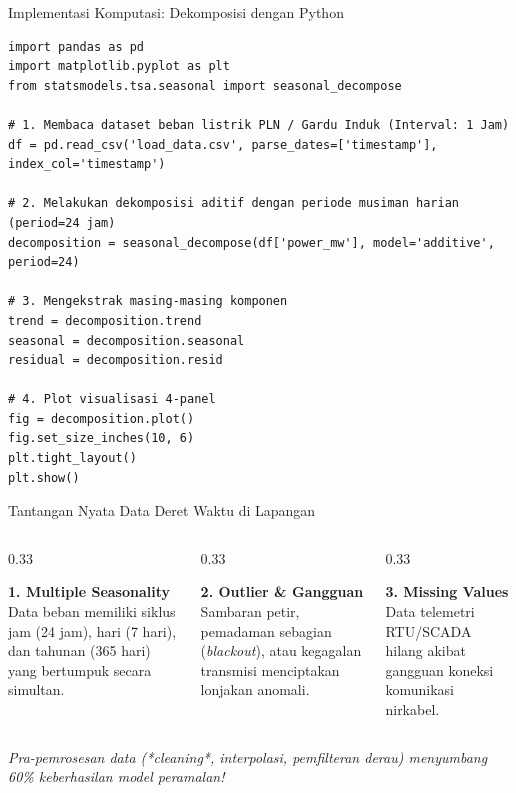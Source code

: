 \documentclass[aspectratio=169, 10pt]{beamer}
\begin{document}
\begin{frame}[fragile]{Implementasi Komputasi: Dekomposisi dengan Python}
\begin{lstlisting}
import pandas as pd
import matplotlib.pyplot as plt
from statsmodels.tsa.seasonal import seasonal_decompose

# 1. Membaca dataset beban listrik PLN / Gardu Induk (Interval: 1 Jam)
df = pd.read_csv('load_data.csv', parse_dates=['timestamp'], index_col='timestamp')

# 2. Melakukan dekomposisi aditif dengan periode musiman harian (period=24 jam)
decomposition = seasonal_decompose(df['power_mw'], model='additive', period=24)

# 3. Mengekstrak masing-masing komponen
trend = decomposition.trend
seasonal = decomposition.seasonal
residual = decomposition.resid

# 4. Plot visualisasi 4-panel
fig = decomposition.plot()
fig.set_size_inches(10, 6)
plt.tight_layout()
plt.show()
\end{lstlisting}
\end{frame}

\begin{frame}{Tantangan Nyata Data Deret Waktu di Lapangan}
    \begin{columns}[T]
        \begin{column}{0.33\textwidth}
            \begin{block}{\textbf{1. Multiple Seasonality}}
                Data beban memiliki siklus jam (24 jam), hari (7 hari), dan tahunan (365 hari) yang bertumpuk secara simultan.
            \end{block}
        \end{column}
        \begin{column}{0.33\textwidth}
            \begin{block}{\textbf{2. Outlier \& Gangguan}}
                Sambaran petir, pemadaman sebagian (\textit{blackout}), atau kegagalan transmisi menciptakan lonjakan anomali.
            \end{block}
        \end{column}
        \begin{column}{0.33\textwidth}
            \begin{block}{\textbf{3. Missing Values}}
                Data telemetri RTU/SCADA hilang akibat gangguan koneksi komunikasi nirkabel.
            \end{block}
        \end{column}
    \end{columns}
    \vspace{0.4cm}
    \begin{center}
        \textit{Pra-pemrosesan data (*cleaning*, interpolasi, pemfilteran derau) menyumbang 60\% keberhasilan model peramalan!}
    \end{center}
\end{frame}
\end{document}
